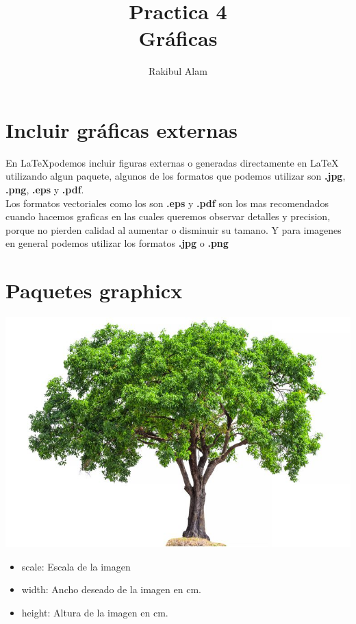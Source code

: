\documentclass[12pt]{article}
\begin{document}
\title{Practica 4 \\ Gráficas}
\author{Rakibul Alam}
\date{}
\maketitle

\tableofcontents

\section{Incluir gráficas externas}

En \LaTeX podemos incluir figuras externas o generadas directamente en \LaTeX \, utilizando algun paquete, algunos de los formatos que podemos utilizar son \textbf{.jpg}, \textbf{.png}, \textbf{.eps} y  \textbf{.pdf}. \\[0.5cm]
Los formatos vectoriales como los son \textbf{.eps} y \textbf{.pdf} son los mas recomendados cuando hacemos graficas en las cuales queremos observar detalles y precision, porque no pierden calidad al aumentar o disminuir su tamano. Y para imagenes en general podemos utilizar los formatos \textbf{.jpg} o \textbf{.png}



\section{Paquetes graphicx}
\begin{center}
\includegraphics[scale=.2]{figuras/tree.jpg}
\end{center}

\begin{itemize}
\item scale: Escala de la imagen
\item width: Ancho deseado de la imagen en cm. 
\item height: Altura de la imagen en cm. 
\end{itemize}
\end{document}
